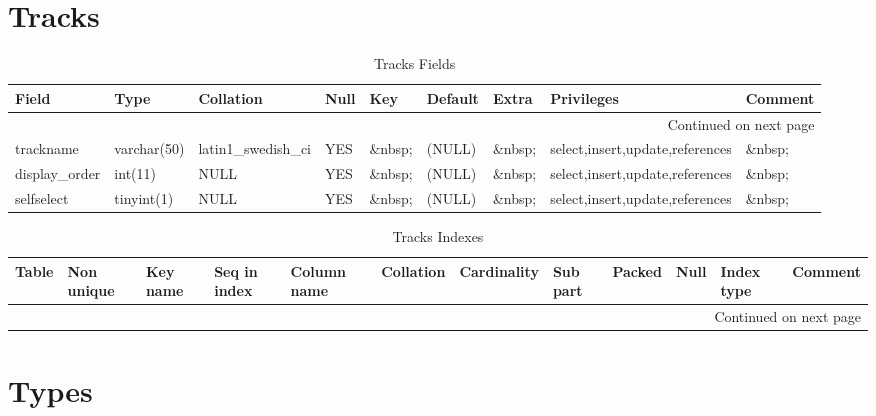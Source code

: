 \documentclass[tablesignature]{scrartcl}
\begin{document}
\section{Tracks}
\label{sec-32}


\begin{longtable}{|l|l|l|l|l|l|l|l|l|}
\caption{Tracks Fields} \label{tbl:tracksfields}\\
\hline
 Field             &  Type         &  Collation                &  Null     &  Key      &  Default  &  Extra              &  Privileges                       &  Comment \\
\hline
\endhead
\hline\multicolumn{9}{r}{Continued on next page}\
\endfoot
\endlastfoot
\hline
 trackid           &  int(11)      &  NULL                     &  \&nbsp;  &  PRI      &  (NULL)   &  auto\_{}increment  &  select,insert,update,references  &  \&nbsp;  \\
 trackname         &  varchar(50)  &  latin1\_{}swedish\_{}ci  &  YES      &  \&nbsp;  &  (NULL)   &  \&nbsp;            &  select,insert,update,references  &  \&nbsp;  \\
 display\_{}order  &  int(11)      &  NULL                     &  YES      &  \&nbsp;  &  (NULL)   &  \&nbsp;            &  select,insert,update,references  &  \&nbsp;  \\
 selfselect        &  tinyint(1)   &  NULL                     &  YES      &  \&nbsp;  &  (NULL)   &  \&nbsp;            &  select,insert,update,references  &  \&nbsp;  \\
\hline
\end{longtable}


\begin{longtable}{|l|l|l|l|l|l|l|l|l|l|l|l|}
\caption{Tracks Indexes} \label{tbl:trackssindexes}\\
\hline
 Table   &  Non unique  &  Key name  &  Seq in index  &  Column name  &  Collation  &  Cardinality  &  Sub part  &  Packed  &  Null     &  Index type  &  Comment \\
\hline
\endhead
\hline\multicolumn{12}{r}{Continued on next page}\
\endfoot
\endlastfoot
\hline
 Tracks  &           0  &  PRIMARY   &             1  &  trackid      &  A          &           22  &  (NULL)    &  (NULL)  &  \&nbsp;  &  BTREE       &  \&nbsp;  \\
\hline
\end{longtable}
\section{Types}
\label{sec-33}
\end{document}
